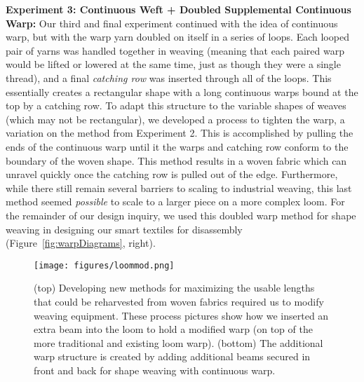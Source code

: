 \documentclass{sigchi}
\newcommand\laura[1]{#1}
\renewcommand\todo[1]{\emph{\color{red}[#1]}}
\begin{document}
\newpage
\textbf{Experiment 3: Continuous Weft + Doubled Supplemental Continuous Warp:} Our third and final experiment continued with the idea of continuous warp, but with the warp yarn doubled on itself in a series of loops. Each looped pair of yarns was handled together in weaving (meaning that each paired warp would be lifted or lowered at the same time, just as though they were a single thread), and a final \emph{catching row} was inserted through all of the loops. This essentially creates a rectangular shape with a long continuous warps bound at the top by a catching row. To adapt this structure to the variable shapes of weaves (which may not be rectangular), we developed a process to tighten the warp, a variation on the method from Experiment 2. This is accomplished by pulling the ends of the continuous warp until it the warps and catching row conform to the boundary of the woven shape. This method results in a woven fabric which can unravel quickly once the catching row is pulled out of the edge. Furthermore, \laura{while there still remain several barriers to scaling to industrial weaving,} this last method seemed \textit{possible} to scale to a larger piece on a more complex loom. %
For the remainder of our design inquiry, we used this doubled warp method for shape weaving in designing our smart textiles for disassembly (Figure~\ref{fig:warpDiagrams}, right).

\begin{figure}[t!]
    \centering
    \texttt{[image: figures/loommod.png]}
    \caption{(top) Developing new methods for maximizing the usable lengths that could be reharvested from woven fabrics required us to modify weaving equipment. These process pictures show how we inserted an extra beam into the loom to hold a modified warp (on top of the more traditional and existing loom warp). (bottom) The additional warp structure is created by adding additional beams secured in front and back for shape weaving with continuous warp.}
    \label{fig:loomMod}
    \vspace{-1.5em}
\end{figure}
\end{document}
